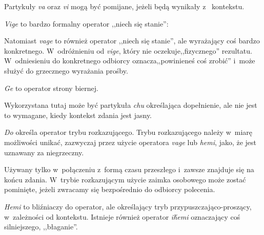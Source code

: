 \begin{spacing}{1.1}


Partykuły \emph{va} oraz \emph{vi} mogą być pomijane, jeżeli będą wynikały z~
kontekstu.

\emph{Vige} to bardzo formalny operator ,,niech się stanie'':


Natomiast \emph{vage} to również operator ,,niech się stanie'', ale wyrażający
coś bardzo konkretnego. W~odróżnieniu od \emph{vige}, który nie
oczekuje,,fizycznego'' rezultatu. W~odniesieniu do konkretnego odbiorcy
oznacza,,powinieneś coś zrobić'' i~może służyć do grzecznego wyrażania prośby.




\emph{Ge} to operator strony biernej.


Wykorzystana tutaj może być partykuła \emph{chu} określająca dopełnienie, ale
nie jest to wymagane, kiedy kontekst zdania jest jasny.


\skipline

\emph{Do} określa operator trybu rozkazującego. Trybu rozkazującego należy
w~miarę możliwości unikać, zazwyczaj przez użycie operatora \emph{vage} lub
\emph{hemi}, jako, że jest uznawany za niegrzeczny.

Używany tylko w~połączeniu z~formą czasu przeszłego i~zawsze znajduje się na
końcu zdania. W~trybie rozkazującym użycie zaimka osobowego może zostać
pominięte, jeżeli zwracamy się bezpośrednio do odbiorcy polecenia.



\emph{Hemi} to bliźniaczy do operator, ale określający tryb
przypuszczająco-proszący, w~zależności od kontekstu. Istnieje również operator
\emph{ih́emi} oznaczający coś silniejszego, ,,błaganie''.


\end{spacing}
